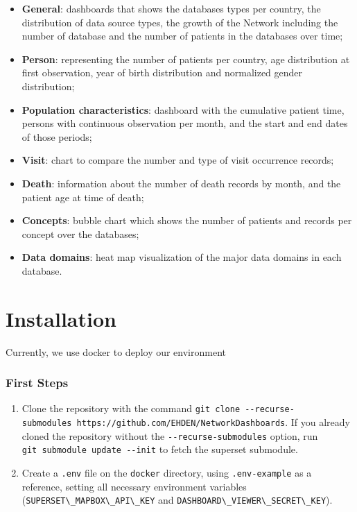 \documentclass[
]{book}
\providecommand{\tightlist}{%
  \setlength{\itemsep}{0pt}\setlength{\parskip}{0pt}}
\begin{document}
\begin{itemize}
\tightlist
\item
  \textbf{General}: dashboards that shows the databases types per country, the distribution of data source types, the growth of the Network including the number of database and the number of patients in the databases over time;
\item
  \textbf{Person}: representing the number of patients per country, age distribution at first observation, year of birth distribution and normalized gender distribution;
\item
  \textbf{Population characteristics}: dashboard with the cumulative patient time, persons with continuous observation per month, and the start and end dates of those periods;
\item
  \textbf{Visit}: chart to compare the number and type of visit occurrence records;
\item
  \textbf{Death}: information about the number of death records by month, and the patient age at time of death;
\item
  \textbf{Concepts}: bubble chart which shows the number of patients and records per concept over the databases;
\item
  \textbf{Data domains}: heat map visualization of the major data domains in each database.
\end{itemize}

\hypertarget{installation}{%
\chapter{Installation}\label{installation}}

Currently, we use docker to deploy our environment

\hypertarget{first-steps}{%
\subsection*{First Steps}\label{first-steps}}

\begin{enumerate}
\def\labelenumi{\arabic{enumi}.}
\item
  Clone the repository with the command \texttt{git\ clone\ -\/-recurse-submodules\ https://github.com/EHDEN/NetworkDashboards}. If you already cloned the repository without the \texttt{-\/-recurse-submodules} option, run \texttt{git\ submodule\ update\ -\/-init} to fetch the superset submodule.
\item
  Create a \texttt{.env} file on the \texttt{docker} directory, using \texttt{.env-example} as a reference, setting all necessary environment variables (\texttt{SUPERSET\textbackslash{}\_MAPBOX\textbackslash{}\_API\textbackslash{}\_KEY} and \texttt{DASHBOARD\textbackslash{}\_VIEWER\textbackslash{}\_SECRET\textbackslash{}\_KEY}).
\end{enumerate}
\end{document}
